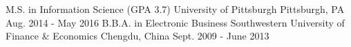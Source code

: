 
\begin{cventries}

  \edu
    {M.S. in Information Science (GPA 3.7)}
    {University of Pittsburgh}
    {Pittsburgh, PA}
    {Aug. 2014 - May 2016}
  \edu
    {B.B.A. in Electronic Business}  %
    {Southwestern University of Finance \& Economics}  %
    {Chengdu, China}  %
    {Sept. 2009 - June 2013}  %
\end{cventries}
